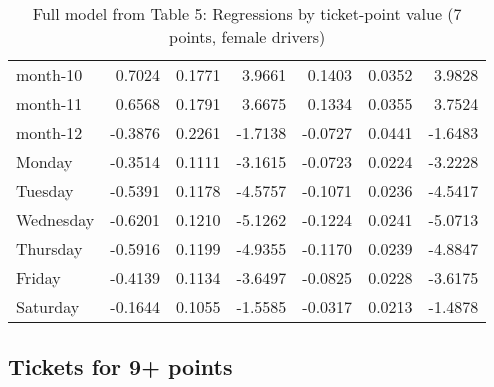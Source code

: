 \documentclass[10pt]{article}
\begin{document}
\begin{table}[ht]
\begin{tabular}{lrrrrrr}
  month-10 & 0.7024 & 0.1771 & 3.9661 & 0.1403 & 0.0352 & 3.9828 \\ 
  month-11 & 0.6568 & 0.1791 & 3.6675 & 0.1334 & 0.0355 & 3.7524 \\ 
  month-12 & -0.3876 & 0.2261 & -1.7138 & -0.0727 & 0.0441 & -1.6483 \\ 
  Monday & -0.3514 & 0.1111 & -3.1615 & -0.0723 & 0.0224 & -3.2228 \\ 
  Tuesday & -0.5391 & 0.1178 & -4.5757 & -0.1071 & 0.0236 & -4.5417 \\ 
  Wednesday & -0.6201 & 0.1210 & -5.1262 & -0.1224 & 0.0241 & -5.0713 \\ 
  Thursday & -0.5916 & 0.1199 & -4.9355 & -0.1170 & 0.0239 & -4.8847 \\ 
  Friday & -0.4139 & 0.1134 & -3.6497 & -0.0825 & 0.0228 & -3.6175 \\ 
  Saturday & -0.1644 & 0.1055 & -1.5585 & -0.0317 & 0.0213 & -1.4878 \\ 
   \hline
\end{tabular}
\caption{Full model from Table 5: Regressions by ticket-point value (7 points, female drivers)} 
\label{tab_5_7_pts_no_age_F}
\end{table}


\clearpage
\pagebreak




\subsection{Tickets for 9+ points}



\end{document}
